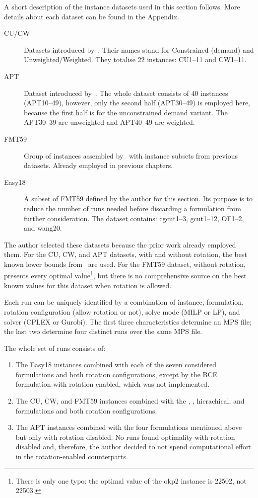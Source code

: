 A short description of the instance datasets used in this section follows.
More details about each dataset can be found in the Appendix.

\begin{description}
	\item [CU/CW] Datasets introduced by~\citet{fayard:1998}. Their names stand for Constrained (demand) and Unweighted/Weighted. They totalise 22 instances: CU1--11 and CW1--11.
	\item [APT] Dataset introduced by~\citet{alvarez:2002:tabu}. The whole dataset consists of 40 instances (APT10--49), however, only the second half (APT30--49) is employed here, because the first half is for the unconstrained demand variant. The APT30--39 are unweighted and APT40--49 are weighted.
	\item [FMT59] Group of instances assembled by~\cite{furini:2016} with instance subsets from previous datasets. Already employed in previous chapters.
	\item [Easy18] A subset of FMT59 defined by the author for this section. Its purpose is to reduce the number of runs needed before discarding a formulation from further consideration. The dataset contains: cgcut1--3, gcut1--12, OF1--2, and wang20.
\end{description}

The author selected these datasets because the prior work already employed them.
For the CU, CW, and APT datasets, with and without rotation, the best known lower bounds from~\citet{velasco:2019} are used.
For the FMT59 dataset, without rotation, \citet{furini:2016} presents every optimal value\footnote{There is only one typo: the optimal value of the okp2 instance is 22502, not 22503.}, but there is no comprehensive source on the best known values for this dataset when rotation is allowed.

Each run can be uniquely identified by a combination of instance, formulation, rotation configuration (allow rotation or not), solve mode (MILP or LP), and solver (CPLEX or Gurobi).
The first three characteristics determine an MPS file; the last two determine four distinct runs over the same MPS file.

The whole set of runs consists of:
\begin{enumerate}
\item The Easy18 instances combined with each of the seven considered formulations and both rotation configurations, except by the BCE formulation with rotation enabled, which was not implemented.
\item The CU, CW, and FMT59 instances combined with the {\modelBecker}, {\modelOrigami}, hierachical, and {\modelImplicit} formulations and both rotation configurations.
\item The APT instances combined with the four formulations mentioned above but only with rotation disabled. No runs found optimality with rotation disabled and, therefore, the author decided to not spend computational effort in the rotation-enabled counterparts. %
\end{enumerate}


